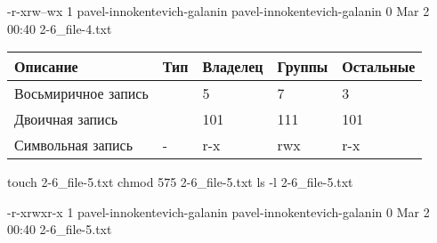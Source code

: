 \begin{OutBox}
    -r-xrw--wx 1 pavel-innokentevich-galanin pavel-innokentevich-galanin 0 Mar  2 00:40 2-6_file-4.txt
\end{OutBox}

\begin{table}[h!]
    \centering
    \begin{tabular}{ | l | l | l | l | l | }
        \hline
        Описание            & Тип   & Владелец  & Группы    & Остальные \\ \hline
        \hline
        Восьмиричное запись & 	    & 5	        & 7 	    & 3         \\ \hline
        Двоичная запись     & 	    & 101 	    & 111 	    & 101       \\ \hline
        Символьная запись 	& -     & r-x 	    & rwx 	    & r-x       \\ \hline
    \end{tabular}
\end{table}


\begin{BashBox}
    touch 2-6_file-5.txt
    chmod 575 2-6_file-5.txt
    ls -l 2-6_file-5.txt
\end{BashBox}

\begin{OutBox}
    -r-xrwxr-x 1 pavel-innokentevich-galanin pavel-innokentevich-galanin 0 Mar  2 00:40 2-6_file-5.txt
\end{OutBox}
